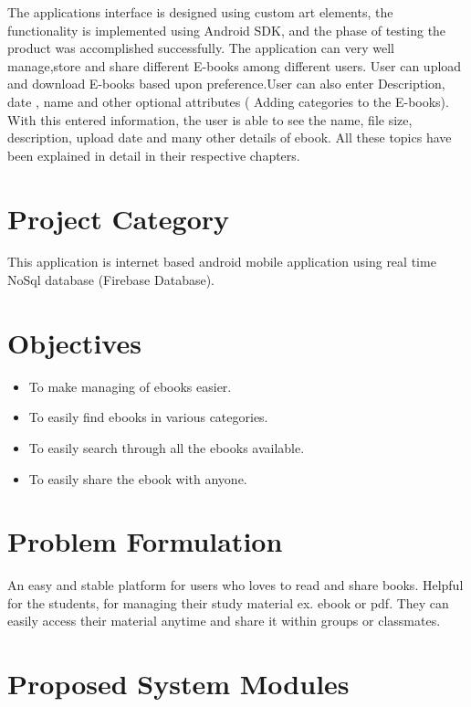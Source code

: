 The applications interface is designed using custom art elements, the functionality is implemented using Android SDK, and the phase of testing the product was accomplished successfully. The application can very well manage,store and share different E-books among different users. User can upload and download E-books based upon preference.User can also enter
Description, date , name  and other optional attributes ( Adding categories  to the E-books). With this entered information, the user is able to see the name, file size, description, upload date and many other details of ebook. All these topics have been explained in detail in their respective chapters.

\section{Project Category}
This application is internet based android mobile application using real time NoSql database (Firebase Database).

\section{Objectives}

\begin{itemize}
	\item To make managing of ebooks easier.

	\item To easily find ebooks in various categories.
	
	\item To easily search through all the ebooks available.
	
	\item To easily share the ebook with anyone. 
\end{itemize}

\section{Problem Formulation}
An easy and stable platform for users who loves to read and share books. Helpful for the students, for managing their study material ex. ebook or pdf. They can easily access their material anytime and share it within groups or classmates. 

\section{Proposed System Modules}

